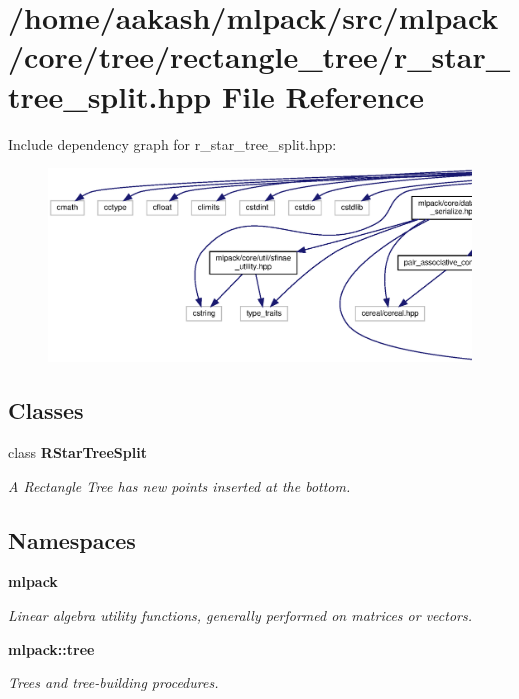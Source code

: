 \section{/home/aakash/mlpack/src/mlpack/core/tree/rectangle\+\_\+tree/r\+\_\+star\+\_\+tree\+\_\+split.hpp File Reference}
\label{r__star__tree__split_8hpp}
Include dependency graph for r\+\_\+star\+\_\+tree\+\_\+split.\+hpp\+:
\nopagebreak
\begin{figure}[H]
\begin{center}
\leavevmode
\includegraphics[width=350pt]{r__star__tree__split_8hpp__incl}
\end{center}
\end{figure}
\subsection*{Classes}
\begin{DoxyCompactItemize}
\item 
class \textbf{ R\+Star\+Tree\+Split}
\begin{DoxyCompactList}\small\item\em A Rectangle Tree has new points inserted at the bottom. \end{DoxyCompactList}\end{DoxyCompactItemize}
\subsection*{Namespaces}
\begin{DoxyCompactItemize}
\item 
 \textbf{ mlpack}
\begin{DoxyCompactList}\small\item\em Linear algebra utility functions, generally performed on matrices or vectors. \end{DoxyCompactList}\item 
 \textbf{ mlpack\+::tree}
\begin{DoxyCompactList}\small\item\em Trees and tree-\/building procedures. \end{DoxyCompactList}\end{DoxyCompactItemize}


